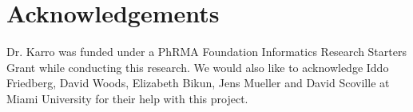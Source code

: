\documentclass[a4,center,fleqn]{NAR}
\begin{document}
\section{Acknowledgements}

Dr. Karro was funded under a PhRMA Foundation Informatics Research
Starters Grant while conducting this research.  We would also like to
acknowledge Iddo Friedberg, David Woods, Elizabeth Bikun, Jens Mueller and David
Scoville at Miami University for their help with this project.

\vspace{3mm}


\end{document}
